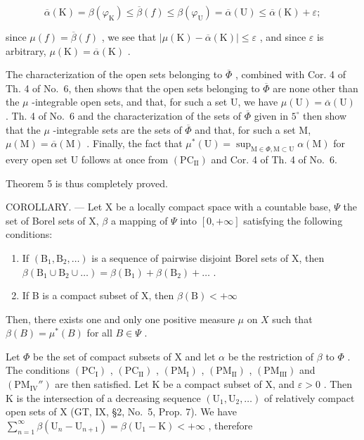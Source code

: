 \[
\overline {{\alpha}} (\mathrm{K}) = \beta (\varphi_ {\mathrm{K}}) \leqslant \overline {{\beta}} (f) \leqslant \beta (\varphi_ {\mathrm{U}}) = \overline {{\alpha}} (\mathrm{U}) \leqslant \overline {{\alpha}} (\mathrm{K}) + \varepsilon ;
\]

since \(\mu(f) = \overline{\beta}(f)\) , we see that \(|\mu(\mathrm{K}) - \overline{\alpha}(\mathrm{K})| \leqslant \varepsilon\) , and since \(\varepsilon\) is arbitrary, \(\mu(\mathrm{K}) = \overline{\alpha}(\mathrm{K})\) .

The characterization of the open sets belonging to \(\overline{\Phi}\) , combined with Cor. 4 of Th. 4 of No.~6, then shows that the open sets belonging to \(\overline{\Phi}\) are none other than the \(\mu\) -integrable open sets, and that, for such a set U, we have \(\mu(\mathrm{U}) = \overline{\alpha}(\mathrm{U})\) . Th. 4 of No.~6 and the characterization of the sets of \(\overline{\Phi}\) given in \(5^{\circ}\) then show that the \(\mu\) -integrable sets are the sets of \(\overline{\Phi}\) and that, for such a set M, \(\mu(\mathrm{M}) = \overline{\alpha}(\mathrm{M})\) . Finally, the fact that \(\mu^{*}(\mathrm{U}) = \sup_{\mathrm{M} \in \Phi, \mathrm{M} \subset \mathrm{U}} \alpha(\mathrm{M})\) for every open set U follows at once from \((\mathrm{PC}_{\mathrm{II}})\) and Cor. 4 of Th. 4 of No.~6.

Theorem 5 is thus completely proved.

COROLLARY. --- Let X be a locally compact space with a countable base, \(\Psi\) the set of Borel sets of X, \(\beta\) a mapping of \(\Psi\) into \([0,+\infty]\) satisfying the following conditions:

\begin{enumerate}
\def\labelenumi{(\roman{enumi})}
\item
  If \((\mathrm{B}_1, \mathrm{B}_2, \ldots)\) is a sequence of pairwise disjoint Borel sets of X, then \(\beta(\mathrm{B}_1 \cup \mathrm{B}_2 \cup \ldots) = \beta(\mathrm{B}_1) + \beta(\mathrm{B}_2) + \ldots\) .
\item
  If B is a compact subset of X, then \(\beta (\mathrm{B}) < +\infty\)
\end{enumerate}

Then, there exists one and only one positive measure \(\mu\) on \(X\) such that \(\beta(B) = \mu^{*}(B)\) for all \(B \in \Psi\) .

Let \(\Phi\) be the set of compact subsets of X and let \(\alpha\) be the restriction of \(\beta\) to \(\Phi\) . The conditions \((\mathrm{PC_I})\) , \((\mathrm{PC_{II}})\) , \((\mathrm{PM_I})\) , \((\mathrm{PM_{II}})\) , \((\mathrm{PM_{III}})\) and \((\mathrm{PM_{IV}''})\) are then satisfied. Let K be a compact subset of X, and \(\varepsilon > 0\) . Then K is the intersection of a decreasing sequence \((\mathrm{U}_1, \mathrm{U}_2, \ldots)\) of relatively compact open sets of X (GT, IX, §2, No.~5, Prop. 7). We have \(\sum_{n=1}^{\infty} \beta(\mathrm{U}_n - \mathrm{U}_{n+1}) = \beta(\mathrm{U}_1 - \mathrm{K}) < +\infty\) , therefore

